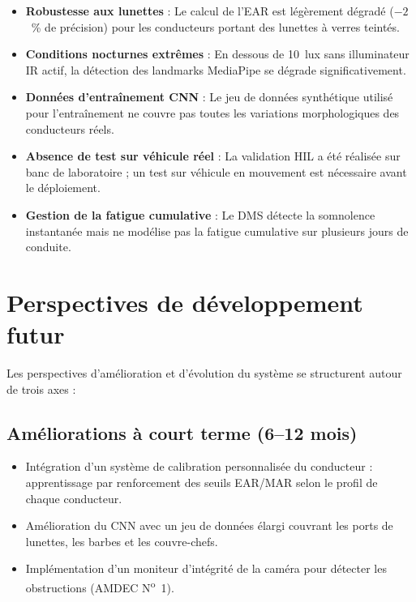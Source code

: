 \documentclass[12pt,a4paper]{report}
\begin{document}
\begin{itemize}
  \item \textbf{Robustesse aux lunettes} : Le calcul de l'EAR est l\'eg\`erement d\'egrad\'e ($-2$~\% de pr\'ecision) pour les conducteurs portant des lunettes \`a verres teint\'es.
  \item \textbf{Conditions nocturnes extr\^emes} : En dessous de 10~lux sans illuminateur IR actif, la d\'etection des landmarks MediaPipe se d\'egrade significativement.
  \item \textbf{Donn\'ees d'entra\^inement CNN} : Le jeu de donn\'ees synth\'etique utilis\'e pour l'entra\^inement ne couvre pas toutes les variations morphologiques des conducteurs r\'eels.
  \item \textbf{Absence de test sur v\'ehicule r\'eel} : La validation HIL a \'et\'e r\'ealis\'ee sur banc de laboratoire ; un test sur v\'ehicule en mouvement est n\'ecessaire avant le d\'eploiement.
  \item \textbf{Gestion de la fatigue cumulative} : Le DMS d\'etecte la somnolence instantan\'ee mais ne mod\'elise pas la fatigue cumulative sur plusieurs jours de conduite.
\end{itemize}

\section{Perspectives de d\'eveloppement futur}

Les perspectives d'am\'elioration et d'\'evolution du syst\`eme se structurent autour de trois axes :

\subsection{Am\'eliorations \`a court terme (6--12 mois)}

\begin{itemize}
  \item Int\'egration d'un syst\`eme de calibration personnalis\'ee du conducteur : apprentissage par renforcement des seuils EAR/MAR selon le profil de chaque conducteur.
  \item Am\'elioration du CNN avec un jeu de donn\'ees \'elargi couvrant les ports de lunettes, les barbes et les couvre-chefs.
  \item Impl\'ementation d'un moniteur d'int\'egrit\'e de la cam\'era pour d\'etecter les obstructions (AMDEC N\textsuperscript{o}~1).
\end{itemize}
\end{document}
